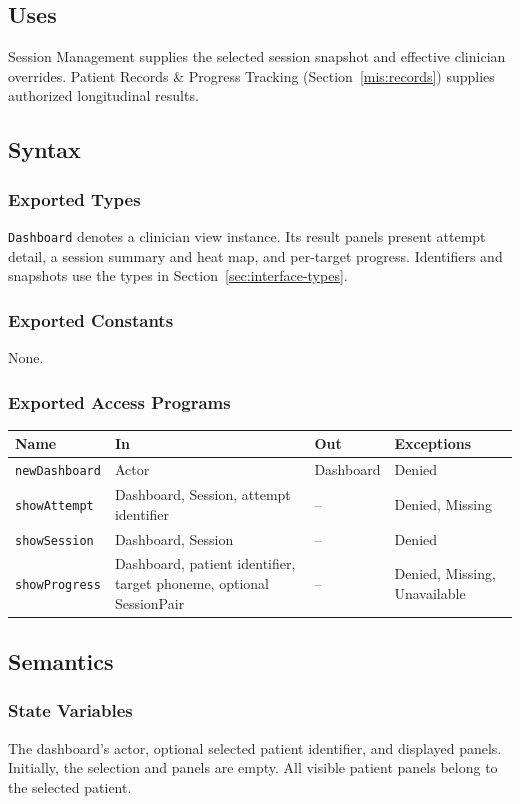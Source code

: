 \documentclass[12pt, titlepage]{article}
\begin{document}
\subsection{Uses}
Session Management supplies the selected session
snapshot and effective clinician overrides. Patient Records \& Progress
Tracking (Section~\ref{mis:records}) supplies authorized longitudinal results.

\subsection{Syntax}

\subsubsection{Exported Types}
\texttt{Dashboard} denotes a clinician view instance. Its result panels
present attempt detail, a session summary and heat map, and per-target
progress. Identifiers and snapshots use the types in
Section~\ref{sec:interface-types}.

\subsubsection{Exported Constants}
None.

\subsubsection{Exported Access Programs}
\noindent\begin{tabularx}{\textwidth}{@{}l X X l@{}}
\toprule
\textbf{Name} & \textbf{In} & \textbf{Out} & \textbf{Exceptions}\\
\midrule
\texttt{newDashboard} & Actor & Dashboard & Denied\\
\texttt{showAttempt} & Dashboard, Session, attempt identifier & -- &
Denied, Missing\\
\texttt{showSession} & Dashboard, Session & -- & Denied\\
\texttt{showProgress} & Dashboard, patient identifier, target phoneme,
optional SessionPair & -- & Denied, Missing, Unavailable\\
\bottomrule
\end{tabularx}

\subsection{Semantics}

\subsubsection{State Variables}
The dashboard's actor, optional selected patient identifier, and displayed
panels. Initially, the selection and panels are empty. All visible patient
panels belong to the selected patient.
\end{document}
